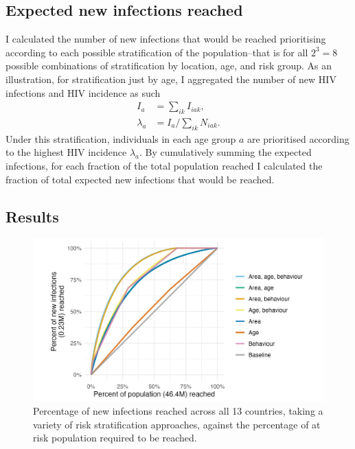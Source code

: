 \documentclass[a4paper, nobind]{templates/ociamthesis}
\begin{document}
\hypertarget{expected-new-infections-reached}{%
\subsection{Expected new infections reached}\label{expected-new-infections-reached}}

I calculated the number of new infections that would be reached prioritising according to each possible stratification of the population--that is for all \(2^3 = 8\) possible combinations of stratification by location, age, and risk group.
As an illustration, for stratification just by age, I aggregated the number of new HIV infections and HIV incidence as such
\begin{align}
    I_a &= \sum_{ik} I_{iak}, \\
    \lambda_a &= I_a / \sum_{ik} N_{iak}.
\end{align}
Under this stratification, individuals in each age group \(a\) are prioritised according to the highest HIV incidence \(\lambda_a\).
By cumulatively summing the expected infections, for each fraction of the total population reached I calculated the fraction of total expected new infections that would be reached.

\hypertarget{results-1}{%
\subsection{Results}\label{results-1}}



\begin{figure}

{\centering \includegraphics[width=0.95\linewidth]{resources/multi-agyw/20230627-144735-3da88508/depends/infections-reached} 

}

\caption{Percentage of new infections reached across all 13 countries, taking a variety of risk stratification approaches, against the percentage of at risk population required to be reached.}\label{fig:infections-reached}
\end{figure}
\end{document}
